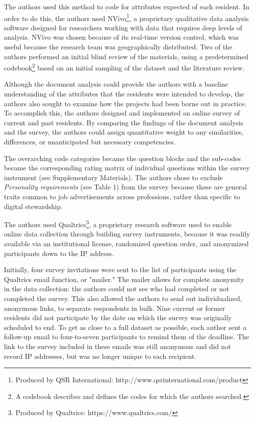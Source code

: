 \documentclass{acm_proc_article-sp}
\begin{document}
The authors used this method to code for attributes expected of each resident. In order to do this, the authors used NVivo\footnote{Produced by QSR International: http://www.qsrinternational.com/product}, a proprietary qualitative data analysis software designed for researchers working with data that requires deep levels of analysis. NVivo was chosen because of its real-time version control, which was useful because the research team was geographically distributed. Two of the authors performed an initial blind review of the materials, using a predetermined codebook\footnote{A codebook describes and defines the codes for which the authors searched.} based on an initial sampling of the dataset and the literature review. 

Although the document analysis could provide the authors with a baseline understanding of the attributes that the residents were intended to develop, the authors also sought to examine how the projects had been borne out in practice. To accomplish this, the authors designed and implemented an online survey of current and past residents. By comparing the findings of the document analysis and the survey, the authors could assign quantitative weight to any similarities, differences, or unanticipated but necessary competencies.

The overarching code categories became the question blocks and the sub-codes became the corresponding rating matrix of individual questions within the survey instrument (see Supplementary Materials). The authors chose to exclude \textit{Personality requirements} (see Table 1) from the survey because these are general traits common to job advertisements across professions, rather than specific to digital stewardship. 

The authors used Qualtrics\footnote{Produced by Qualtrics: https://www.qualtrics.com/}, a proprietary research software used to enable online data collection through building survey instruments, because it was readily available via an institutional license, randomized question order, and anonymized participants down to the IP address.

Initially, four survey invitations were sent to the list of participants using the Qualtrics email function, or "mailer." The mailer allows for complete anonymity in the data collection: the authors could not see who had completed or not completed the survey. This also allowed the authors to send out individualized, anonymous links, to separate respondents in bulk. Nine current or former residents did not participate by the date on which the survey was originally scheduled to end. To get as close to a full dataset as possible, each author sent a follow-up email to four-to-seven participants to remind them of the deadline. The link to the survey included in these emails was still anonymous and did not record IP addresses, but was no longer unique to each recipient. 
\end{document}
